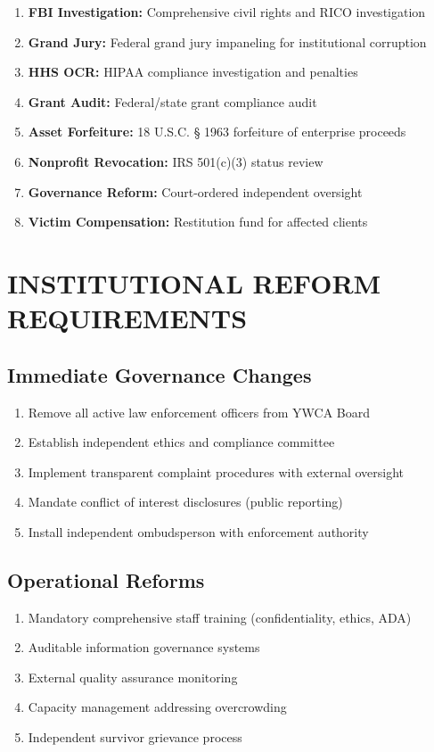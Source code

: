 \documentclass[12pt,oneside]{article}
\begin{document}
\begin{enumerate}
\item \textbf{FBI Investigation:} Comprehensive civil rights and RICO investigation
\item \textbf{Grand Jury:} Federal grand jury impaneling for institutional corruption
\item \textbf{HHS OCR:} HIPAA compliance investigation and penalties
\item \textbf{Grant Audit:} Federal/state grant compliance audit
\item \textbf{Asset Forfeiture:} 18 U.S.C. § 1963 forfeiture of enterprise proceeds
\item \textbf{Nonprofit Revocation:} IRS 501(c)(3) status review
\item \textbf{Governance Reform:} Court-ordered independent oversight
\item \textbf{Victim Compensation:} Restitution fund for affected clients
\end{enumerate}

\section*{INSTITUTIONAL REFORM REQUIREMENTS}

\subsection*{Immediate Governance Changes}

\begin{enumerate}
\item Remove all active law enforcement officers from YWCA Board
\item Establish independent ethics and compliance committee
\item Implement transparent complaint procedures with external oversight
\item Mandate conflict of interest disclosures (public reporting)
\item Install independent ombudsperson with enforcement authority
\end{enumerate}

\subsection*{Operational Reforms}

\begin{enumerate}
\item Mandatory comprehensive staff training (confidentiality, ethics, ADA)
\item Auditable information governance systems
\item External quality assurance monitoring
\item Capacity management addressing overcrowding
\item Independent survivor grievance process
\end{enumerate}
\end{document}
